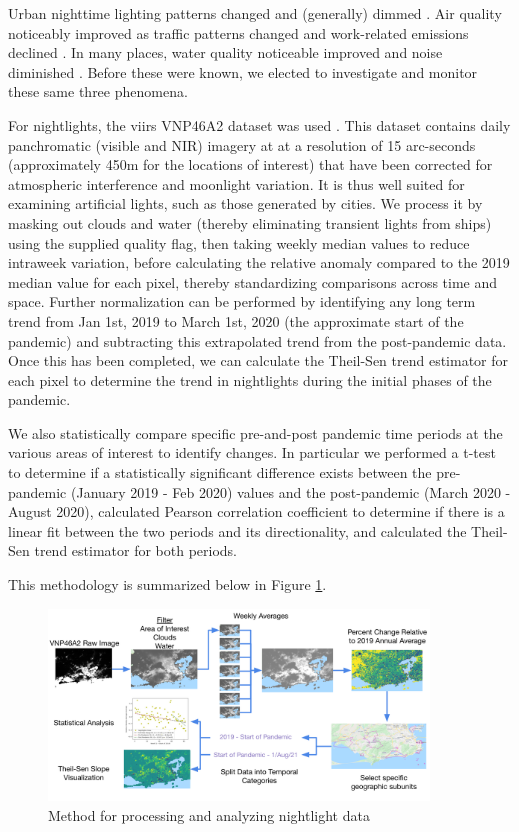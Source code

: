 Urban nighttime lighting patterns changed and (generally) dimmed \cite{elvidgeDimmingLightsChina2020}. Air quality noticeably improved as traffic patterns changed and work-related emissions declined \cite{isaifanDramaticImpactCoronavirus2020}. In many places, water quality noticeable improved and noise diminished \cite{aroraCoronavirusLockdownHelped2020}. Before these were known, we elected to investigate and monitor these same three phenomena.

For nightlights, the \ac{viirs} VNP46A2 dataset was used \cite{romanNASABlackMarble2018}. This dataset contains daily panchromatic (visible and NIR) imagery at at a resolution of 15 arc-seconds (approximately 450m for the locations of interest) that have been corrected for atmospheric interference and moonlight variation. It is thus well suited for examining artificial lights, such as those generated by cities. We process it by masking out clouds and water (thereby eliminating transient lights from ships) using the supplied quality flag, then taking weekly median values to reduce intraweek variation, before calculating the relative anomaly compared to the 2019 median value for each pixel, thereby standardizing comparisons across time and space. Further normalization can be performed by identifying any long term trend from Jan 1st, 2019 to March 1st, 2020 (the approximate start of the pandemic) and subtracting this extrapolated trend from the post-pandemic data. Once this has been completed, we can calculate the Theil-Sen trend estimator for each pixel to determine the trend in nightlights during the initial phases of the pandemic.

We also statistically compare specific pre-and-post pandemic time periods at the various areas of interest to identify changes. In particular we performed a t-test to determine if a statistically significant difference exists between the pre-pandemic (January 2019 - Feb 2020) values and the post-pandemic (March 2020 - August 2020), calculated Pearson correlation coefficient to determine if there is a linear fit between the two periods and its directionality, and calculated the Theil-Sen trend estimator for both periods.

This methodology is summarized below in Figure \ref{fig:nightlights_method}.

\begin{figure}[!htb]
\centering
\includegraphics[width=0.9\textwidth]{Figures/chap5/nightlights_method.png}
\caption[Nightlights Processing Methodology]{Method for processing and analyzing nightlight data}
\label{fig:nightlights_method}
\end{figure}

